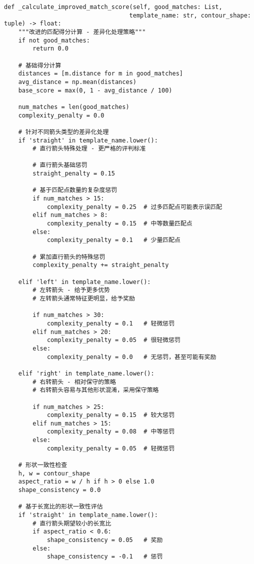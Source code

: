 \documentclass[12pt]{article}
\begin{document}
\begin{lstlisting}[caption=差异化评分策略实现]
def _calculate_improved_match_score(self, good_matches: List, 
                                   template_name: str, contour_shape: tuple) -> float:
    """改进的匹配得分计算 - 差异化处理策略"""
    if not good_matches:
        return 0.0
    
    # 基础得分计算
    distances = [m.distance for m in good_matches]
    avg_distance = np.mean(distances)
    base_score = max(0, 1 - avg_distance / 100)
    
    num_matches = len(good_matches)
    complexity_penalty = 0.0
    
    # 针对不同箭头类型的差异化处理
    if 'straight' in template_name.lower():
        # 直行箭头特殊处理 - 更严格的评判标准
        
        # 直行箭头基础惩罚
        straight_penalty = 0.15
        
        # 基于匹配点数量的复杂度惩罚
        if num_matches > 15:
            complexity_penalty = 0.25  # 过多匹配点可能表示误匹配
        elif num_matches > 8:
            complexity_penalty = 0.15  # 中等数量匹配点
        else:
            complexity_penalty = 0.1   # 少量匹配点
        
        # 累加直行箭头的特殊惩罚
        complexity_penalty += straight_penalty
        
    elif 'left' in template_name.lower():
        # 左转箭头 - 给予更多优势
        # 左转箭头通常特征更明显，给予奖励
        
        if num_matches > 30:
            complexity_penalty = 0.1   # 轻微惩罚
        elif num_matches > 20:
            complexity_penalty = 0.05  # 很轻微惩罚
        else:
            complexity_penalty = 0.0   # 无惩罚，甚至可能有奖励
            
    elif 'right' in template_name.lower():
        # 右转箭头 - 相对保守的策略
        # 右转箭头容易与其他形状混淆，采用保守策略
        
        if num_matches > 25:
            complexity_penalty = 0.15  # 较大惩罚
        elif num_matches > 15:
            complexity_penalty = 0.08  # 中等惩罚
        else:
            complexity_penalty = 0.05  # 轻微惩罚
    
    # 形状一致性检查
    h, w = contour_shape
    aspect_ratio = w / h if h > 0 else 1.0
    shape_consistency = 0.0
    
    # 基于长宽比的形状一致性评估
    if 'straight' in template_name.lower():
        # 直行箭头期望较小的长宽比
        if aspect_ratio < 0.6:
            shape_consistency = 0.05   # 奖励
        else:
            shape_consistency = -0.1   # 惩罚
            

\end{lstlisting}
\end{document}
